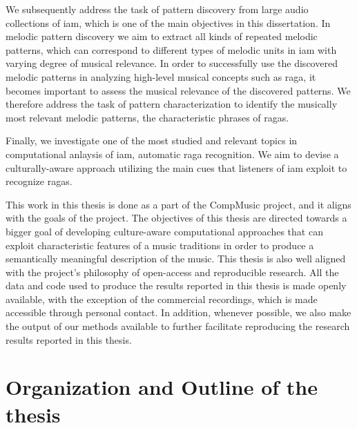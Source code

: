 We subsequently address the task of pattern discovery from large audio collections of \gls{iam}, which is one of the main objectives in this dissertation. In melodic pattern discovery we aim to extract all kinds of repeated melodic patterns, which can correspond to different types of melodic units in \gls{iam} with varying degree of musical relevance. In order to successfully use the discovered melodic patterns in analyzing high-level musical concepts such as \gls{raga}, it becomes important to assess the musical relevance of the discovered patterns. We therefore address the task of pattern characterization to identify the musically most relevant melodic patterns, the characteristic phrases of \glspl{raga}.

Finally, we investigate one of the most studied and relevant topics in computational anlaysis of \gls{iam}, automatic \gls{raga} recognition. We aim to devise a culturally-aware approach utilizing the main cues that listeners of \gls{iam} exploit to recognize \glspl{raga}. 

This work in this thesis is done as a part of the CompMusic project, and it aligns with the goals of the project. The objectives of this thesis are directed towards a bigger goal of developing culture-aware computational approaches that can exploit characteristic features of a music traditions in order to produce a semantically meaningful description of the music. This thesis is also well aligned with the project's philosophy of open-access and reproducible research. All the data and code used to produce the results reported in this thesis is made openly available, with the exception of the commercial recordings, which is made accessible through personal contact. In addition, whenever possible, we also make the output of our methods available to further facilitate reproducing the research results reported in this thesis.




\section{Organization and Outline of the thesis}
\label{sec:intro_organization}



